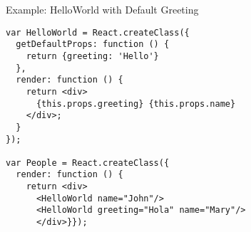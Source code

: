 \documentclass[presentation]{beamer}
\begin{document}
\begin{frame}[fragile,label={sec:orgheadline20}]{Example: HelloWorld with Default Greeting}
 \begin{verbatim}
var HelloWorld = React.createClass({
  getDefaultProps: function () {
    return {greeting: 'Hello'}
  },
  render: function () {
    return <div>
      {this.props.greeting} {this.props.name}
    </div>;
  }
});

var People = React.createClass({
  render: function () {
    return <div>
      <HelloWorld name="John"/>
      <HelloWorld greeting="Hola" name="Mary"/>
      </div>}});
\end{verbatim}
\end{frame}
\end{document}
